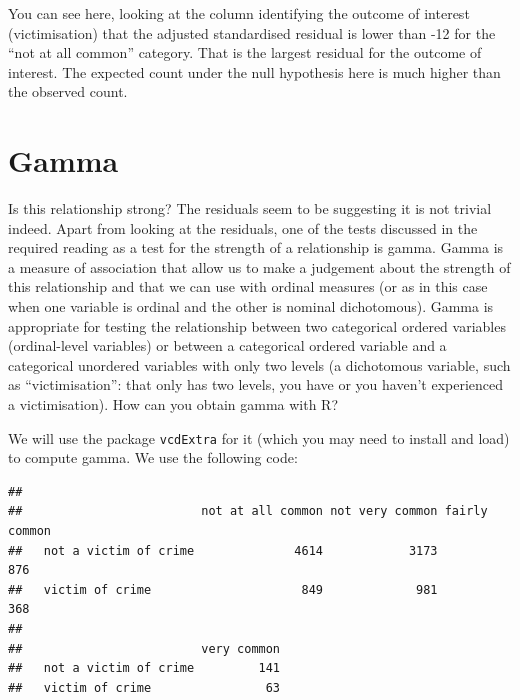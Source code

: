 \documentclass[
]{book}
\newenvironment{Shaded}{\begin{snugshade}}{\end{snugshade}}
\newcommand{\DocumentationTok}[1]{\textcolor[rgb]{0.56,0.35,0.01}{\textbf{\textit{#1}}}}
\newcommand{\FloatTok}[1]{\textcolor[rgb]{0.00,0.00,0.81}{#1}}
\newcommand{\FunctionTok}[1]{\textcolor[rgb]{0.00,0.00,0.00}{#1}}
\newcommand{\NormalTok}[1]{#1}
\newcommand{\OtherTok}[1]{\textcolor[rgb]{0.56,0.35,0.01}{#1}}
\newcommand{\SpecialCharTok}[1]{\textcolor[rgb]{0.00,0.00,0.00}{#1}}
\begin{document}
You can see here, looking at the column identifying the outcome of interest (victimisation) that the adjusted standardised residual is lower than -12 for the ``not at all common'' category. That is the largest residual for the outcome of interest. The expected count under the null hypothesis here is much higher than the observed count.

\hypertarget{gamma}{%
\section{Gamma}\label{gamma}}

Is this relationship strong? The residuals seem to be suggesting it is not trivial indeed. Apart from looking at the residuals, one of the tests discussed in the required reading as a test for the strength of a relationship is gamma. Gamma is a measure of association that allow us to make a judgement about the strength of this relationship and that we can use with ordinal measures (or as in this case when one variable is ordinal and the other is nominal dichotomous). Gamma is appropriate for testing the relationship between two categorical ordered variables (ordinal-level variables) or between a categorical ordered variable and a categorical unordered variables with only two levels (a dichotomous variable, such as ``victimisation'': that only has two levels, you have or you haven't experienced a victimisation). How can you obtain gamma with R?

We will use the package \texttt{vcdExtra} for it (which you may need to install and load) to compute gamma. We use the following code:

\begin{Shaded}
\end{Shaded}

\begin{verbatim}
##                        
##                         not at all common not very common fairly common
##   not a victim of crime              4614            3173           876
##   victim of crime                     849             981           368
##                        
##                         very common
##   not a victim of crime         141
##   victim of crime                63
\end{verbatim}
\end{document}
